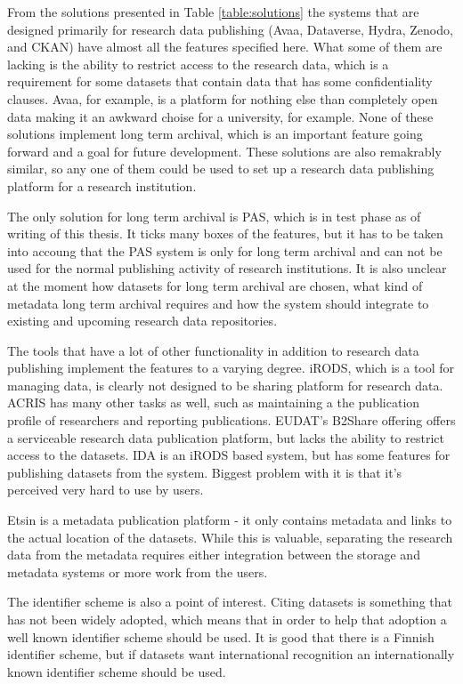 From the solutions presented in Table \ref{table:solutions} the systems that
are designed primarily for research data publishing (Avaa, Dataverse, Hydra,
Zenodo, and CKAN) have almost all the features specified here. What some of
them are lacking is the ability to restrict access to the research data, which
is a requirement for some datasets that contain data that has some
confidentiality clauses. Avaa, for example, is a platform for nothing else than
completely open data making it an awkward choise for a university, for example.
None of these solutions implement long term archival,
which is an important feature going forward and a goal for future development.
These solutions are also remakrably similar, so any one of them could be used
to set up a research data publishing platform for a research institution.

The only solution for long term archival is PAS, which is in test phase as of
writing of this thesis. It ticks many boxes of the features, but it has to be
taken into accoung that the PAS system is only for long term archival and
can not be used for the normal publishing activity of research institutions.
It is also unclear at the moment how datasets for long term archival are
chosen, what kind of metadata long term archival requires and how the system
should integrate to existing and upcoming research data repositories.

The tools that have a lot of other functionality in addition to research data
publishing implement the features to a varying degree. iRODS, which is a tool
for managing data, is clearly not designed to be sharing platform for
research data. ACRIS has many other tasks as well, such as maintaining a the
publication profile of researchers and reporting publications. EUDAT's B2Share
offering offers a serviceable research data publication platform, but lacks the
ability to restrict access to the datasets. IDA is an iRODS based system, but
has some features for publishing datasets from the system. Biggest problem with
it is that it's perceived very hard to use by users.

Etsin is a metadata publication platform - it only contains metadata and links
to the actual location of the datasets. While this is valuable, separating the
research data from the metadata requires either integration between the storage
and metadata systems or more work from the users.

The identifier scheme is also a point of interest. Citing datasets is something
that has not been widely adopted, which means that in order to help that
adoption a well known identifier scheme should be used. It is good that there
is a Finnish identifier scheme, but if datasets want international recognition
an internationally known identifier scheme should be used.

